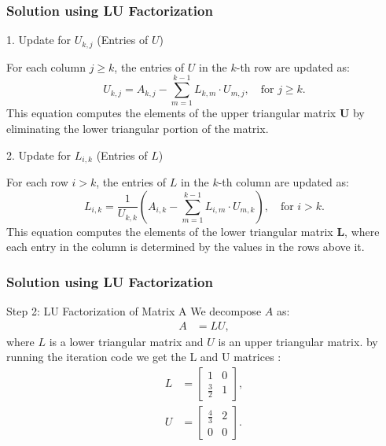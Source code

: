 \documentclass{beamer}
\theoremstyle{remark}
\numberwithin{equation}{section}
\begin{document}
\begin{frame}
\frametitle{Solution using LU Factorization}
1. Update for $ U_{k,j} $ (Entries of $ U $)
	
	For each column $ j \geq k $, the entries of $ U $ in the $ k $-th row are updated as:
	\[
	U_{k,j} = A_{k,j} - \sum_{m=1}^{k-1} L_{k,m} \cdot U_{m,j}, \quad \text{for } j \geq k.
	\]
	This equation computes the elements of the upper triangular matrix $ \mathbf{U} $ by eliminating the lower triangular portion of the matrix.
	
	2. Update for $ L_{i,k} $ (Entries of $ L $)
	
	For each row $ i > k $, the entries of $ L $ in the $ k $-th column are updated as:
	\[
	L_{i,k} = \frac{1}{U_{k,k}} \left( A_{i,k} - \sum_{m=1}^{k-1} L_{i,m} \cdot U_{m,k} \right), \quad \text{for } i > k.
	\]
	This equation computes the elements of the lower triangular matrix $ \mathbf{L} $, where each entry in the column is determined by the values in the rows above it.\\

	

\end{frame}



\begin{frame}
\frametitle{Solution using LU Factorization}
Step 2: LU Factorization of Matrix A
	We decompose $A$ as:
	\begin{align}
		A &= LU,
	\end{align}
	where $L$ is a lower triangular matrix and $U$ is an upper triangular matrix.
	by running the iteration code we get the L and U matrices :
	\begin{align}
		L &= \begin{bmatrix} 1 & 0 \\ \frac{3}{2} & 1 \end{bmatrix}, \\
		U &= \begin{bmatrix} \frac{4}{3} & 2 \\ 0 & 0 \end{bmatrix}.
	\end{align}
	
	

	

\end{frame}
\end{document}
